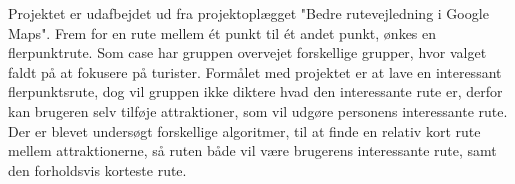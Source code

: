 Projektet er udafbejdet ud fra projektoplægget "Bedre rutevejledning i Google Maps". Frem for en rute mellem ét punkt til ét andet punkt, ønkes en flerpunktrute. Som case har gruppen overvejet forskellige grupper, hvor valget faldt på at fokusere på turister. Formålet med projektet er at lave en interessant flerpunktsrute, dog vil gruppen ikke diktere hvad den interessante rute er, derfor kan brugeren selv tilføje attraktioner, som vil udgøre personens interessante rute. Der er blevet undersøgt forskellige algoritmer, til at finde en relativ kort rute mellem attraktionerne, så ruten både vil være brugerens interessante rute, samt den forholdsvis korteste rute.
